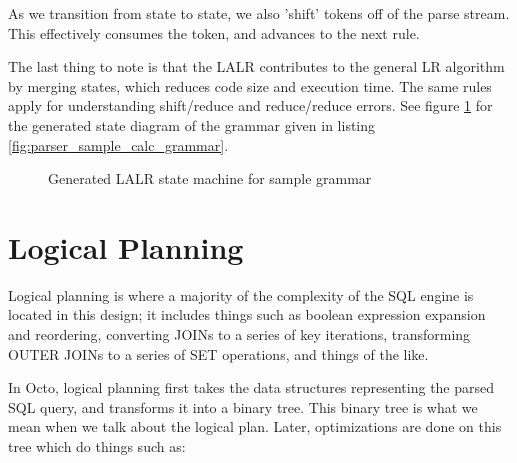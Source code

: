\documentclass[]{article}
\begin{document}
As we transition from state to state, we also 'shift' tokens off of the parse stream.
This effectively consumes the token, and advances to the next rule.

The last thing to note is that the LALR contributes to the general LR algorithm by merging states, which reduces code size and execution time.
The same rules apply for understanding shift/reduce and reduce/reduce errors.
See figure \ref{fig:parser_generated_graph} for the generated state diagram of the grammar given in listing \ref{fig:parser_sample_calc_grammar}.

\begin{figure}
	\begin{center}
	\end{center}
	\label{fig:parser_generated_graph}
	\caption{Generated LALR state machine for sample grammar}
\end{figure}


\section{Logical Planning}

Logical planning is where a majority of the complexity of the SQL engine is located in this design; it includes things such as boolean expression expansion and reordering, converting JOINs to a series of key iterations, transforming OUTER JOINs to a series of SET operations, and things of the like.

In Octo, logical planning first takes the data structures representing the parsed SQL query, and transforms it into a binary tree.
This binary tree is what we mean when we talk about the logical plan.
Later, optimizations are done on this tree which do things such as:
\end{document}
